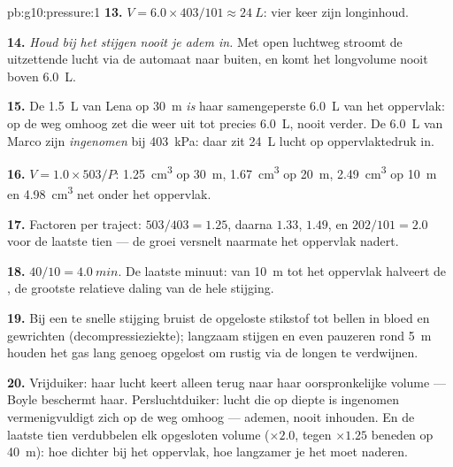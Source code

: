 \begin{solution}{pb:g10:pressure:1}
\textbf{13.} $V = 6.0 \times 403/101 \approx \qty{24}{L}$: vier keer
zijn longinhoud.

\textbf{14.} \emph{Houd bij het stijgen nooit je adem in.} Met open
luchtweg stroomt de uitzettende lucht via de automaat naar buiten, en
komt het longvolume nooit boven \qty{6.0}{L}.

\textbf{15.} De \qty{1.5}{L} van Lena op \qty{30}{m} \emph{is} haar
samengeperste \qty{6.0}{L} van het oppervlak: op de weg omhoog zet die
weer uit tot precies \qty{6.0}{L}, nooit verder. De \qty{6.0}{L} van
Marco zijn \emph{ingenomen} bij \qty{403}{kPa}: daar zit \qty{24}{L}
lucht op oppervlaktedruk in.

\textbf{16.} $V = 1.0 \times 503/P$: \qty{1.25}{cm^3} op \qty{30}{m},
\qty{1.67}{cm^3} op \qty{20}{m}, \qty{2.49}{cm^3} op \qty{10}{m} en
\qty{4.98}{cm^3} net onder het oppervlak.

\textbf{17.} Factoren per traject: $503/403 = 1.25$, daarna $1.33$,
$1.49$, en $202/101 = 2.0$ voor de laatste tien  --- de groei
versnelt naarmate het oppervlak nadert.

\textbf{18.} $40/10 = \qty{4.0}{min}$. De laatste minuut: van
\qty{10}{m} tot het oppervlak halveert de , de grootste
relatieve daling van de hele stijging.

\textbf{19.} Bij een te snelle stijging bruist de opgeloste stikstof
tot bellen in bloed en gewrichten (decompressieziekte); langzaam
stijgen en even pauzeren rond \qty{5}{m} houden het gas lang genoeg
opgelost om rustig via de longen te verdwijnen.

\textbf{20.} Vrijduiker: haar lucht keert alleen terug naar haar
oorspronkelijke volume --- Boyle beschermt haar. Persluchtduiker: lucht
die op diepte is ingenomen vermenigvuldigt zich op de weg omhoog ---
ademen, nooit inhouden. En de laatste tien  verdubbelen elk
opgesloten volume ($\times 2.0$, tegen $\times 1.25$ beneden op
\qty{40}{m}): hoe dichter bij het oppervlak, hoe langzamer je het moet
naderen.
\end{solution}
